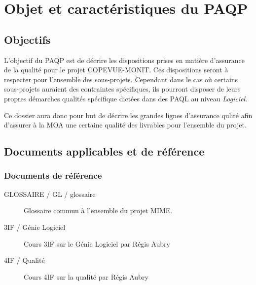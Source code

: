 \documentclass{mise_en_page}
\begin{document}
\maketitle

\begin{historique}
\end{historique}

\newpage

\tableofcontents

\section{Objet et caractéristiques du PAQP}

\subsection{Objectifs}
L’objectif du PAQP est de décrire les dispositions prises en matière d’assurance de la qualité pour le projet COPEVUE-MONIT. Ces dispositions seront à respecter pour l'ensemble des sous-projets. Cependant dans le cas où certains sous-projets auraient des contraintes spécifiques, ils pourront disposer de leurs propres démarches qualités spécifique dictées dans des PAQL au niveau \emph{Logiciel}.

Ce dossier aura donc pour but de décrire les grandes lignes d'assurance qulité afin d'assurer à la MOA une certaine qualité des livrables pour l'ensemble du projet.

\subsection{Documents applicables et de référence}

\subsubsection{Documents de référence}

\begin{description}
	\item[GLOSSAIRE / GL / glossaire] Glossaire commun à l'ensemble du projet MIME.
	\item[3IF / Génie Logiciel] Cours 3IF sur le Génie Logiciel par Régis Aubry
	\item[4IF / Qualité] Cours 4IF sur la qualité par Régis Aubry
\end{description}
\end{document}
